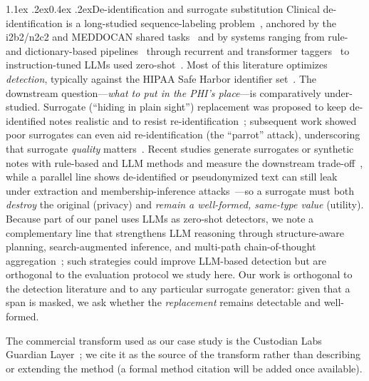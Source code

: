\documentclass[11pt]{article}
\makeatletter
\renewcommand\subsection{\@startsection{subsection}{2}{\z@}%
  {1.1ex \@plus.2ex}{0.4ex \@plus.2ex}{\normalfont\normalsize\bfseries}}
\makeatother
\begin{document}
\subsection{De-identification and surrogate substitution}
Clinical de-identification is a long-studied sequence-labeling problem~\citep{uzuner2007evaluating}, anchored by the i2b2/n2c2 and MEDDOCAN shared tasks~\citep{stubbs2015i2b2,marimon2019meddocan} and by systems ranging from rule- and dictionary-based pipelines~\citep{presidio} through recurrent and transformer taggers~\citep{dernoncourt2017deid,liu2017deid,johnson2020deid} to instruction-tuned LLMs used zero-shot~\citep{liu2023deidgpt}. Most of this literature optimizes \emph{detection}, typically against the HIPAA Safe Harbor identifier set~\citep{hhs2012safeharbor}. The downstream question---\emph{what to put in the PHI's place}---is comparatively under-studied. Surrogate (``hiding in plain sight'') replacement was proposed to keep de-identified notes realistic and to resist re-identification~\citep{carrell2013hiding}; subsequent work showed poor surrogates can even aid re-identification (the ``parrot'' attack), underscoring that surrogate \emph{quality} matters~\citep{carrell2020parrot}. Recent studies generate surrogates or synthetic notes with rule-based and LLM methods and measure the downstream trade-off~\citep{yermilov2023privacy,kim2024generalizing}, while a parallel line shows de-identified or pseudonymized text can still leak under extraction and membership-inference attacks~\citep{carlini2021extracting,lehman2021bert,sarkar2024deid}---so a surrogate must both \emph{destroy} the original (privacy) and \emph{remain a well-formed, same-type value} (utility). Because part of our panel uses LLMs as zero-shot detectors, we note a complementary line that strengthens LLM reasoning through structure-aware planning, search-augmented inference, and multi-path chain-of-thought aggregation~\citep{xiong2025deliberate,xiong2026enhancing,xiong2026adaptive,xiong2025enhancing}; such strategies could improve LLM-based detection but are orthogonal to the evaluation protocol we study here. Our work is orthogonal to the detection literature and to any particular surrogate generator: given that a span is masked, we ask whether the \emph{replacement} remains detectable and well-formed.

The commercial transform used as our case study is the Custodian Labs Guardian Layer~\citep{custodian_labs}; we cite it as the source of the transform rather than describing or extending the method (a formal method citation will be added once available).
\end{document}
